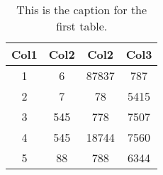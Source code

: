 \begin{table}[h!]
  \centering
  \begin{tabular}{||c c c c||}
   \hline
   Col1 & Col2 & Col2 & Col3 \\ [0.5ex]
   \hline\hline
   1 & 6 & 87837 & 787 \\
   2 & 7 & 78 & 5415 \\
   3 & 545 & 778 & 7507 \\
   4 & 545 & 18744 & 7560 \\
   5 & 88 & 788 & 6344 \\ [1ex]
   \hline
  \end{tabular}
  \caption{This is the caption for the first table.}
  \label{reconstruction-error-comparisons-between-regimes-stats:1}
\end{table}
